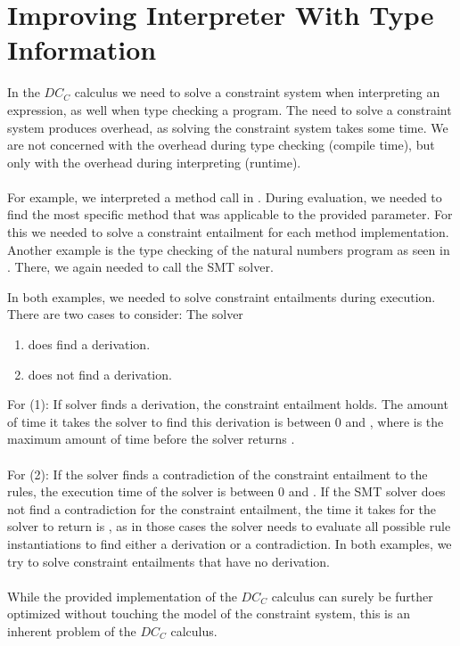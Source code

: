 \chapter{Improving Interpreter With Type Information}
\label{chp:learning}
In the $DC_C$ calculus we need to solve a constraint system
when interpreting an expression, as well when type checking a program.
The need to solve a constraint system produces overhead,
as solving the constraint system takes some time.
We are not concerned with the overhead during type checking (compile time),
but only with the overhead during interpreting (runtime).\\
\\
For example, we interpreted a method call in .
During evaluation, we needed to find the most specific method
that was applicable to the provided parameter.
For this we needed to solve a constraint entailment
for each method implementation.
Another example is the type checking of the natural numbers program
as seen in .
There, we again needed to call the SMT solver.

In both examples, we needed to solve constraint entailments during execution.
There are two cases to consider: The solver
\begin{enumerate}
  \item does find a derivation.
  \item does not find a derivation.
\end{enumerate}
For (1):
If solver finds a derivation,
the constraint entailment holds.
The amount of time it takes the solver to find this derivation
is between $0$ and ,
where  is the maximum amount of time before the solver returns .\\
\\
For (2):
If the solver finds a contradiction of the constraint entailment to the rules,
the execution time of the solver is between $0$ and .
If the SMT solver does not find a contradiction for the constraint entailment,
the time it takes for the solver to return is ,
as in those cases the solver needs to evaluate all possible rule instantiations
to find either a derivation or a contradiction.
In both examples, we try to solve constraint entailments that have no derivation.\\
\\
While the provided implementation of the $DC_C$ calculus
can surely be further optimized without
touching the model of the constraint system,
this is an inherent problem of the $DC_C$ calculus.

